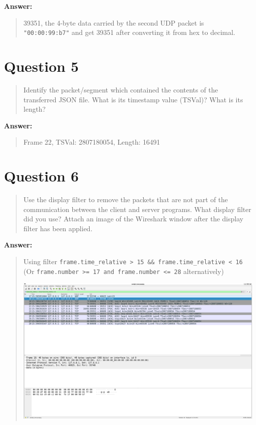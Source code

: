 \documentclass{article}
\begin{document}
\textbf{Answer:}
\begin{quote}
    39351, the 4-byte data carried by the second UDP packet is \texttt{"00:00:99:b7"} and get 39351 after converting it from hex to decimal.
\end{quote}

\section*{Question 5}
\begin{quote}
    Identify the packet/segment which contained the contents of the transferred JSON file. What is its timestamp value (TSVal)? What is its length?
\end{quote}

\textbf{Answer:}
\begin{quote}
    Frame 22, TSVal: 2807180054, Length: 16491
\end{quote}

\section*{Question 6}
\begin{quote}
    Use the display filter to remove the packets that are not part of the communication between the client and server programs. What display filter did you use? Attach an image of the Wireshark window after the display filter has been applied.
\end{quote}

\textbf{Answer:}
\begin{quote}
    Using filter \texttt{frame.time\_relative > 15 \&\& frame.time\_relative < 16}\\
    (Or \texttt{frame.number >= 17 and frame.number <= 28} alternatively)
    \begin{center}
        \includegraphics[scale=0.34]{3.3q6.png}
    \end{center}
\end{quote}
\end{document}
